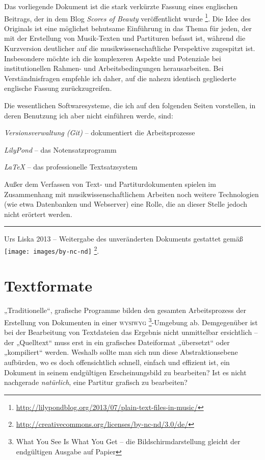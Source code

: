 \documentclass[DIV=12]{scrreprt}
\begin{document}
\medskip
Das vorliegende Dokument ist die stark verkürzte Fassung eines englischen Beitrags, der in dem Blog \emph{Scores of Beauty} veröffentlicht wurde%
\footnote{\url{http://lilypondblog.org/2013/07/plain-text-files-in-music/}}.
Die Idee des Originals ist eine möglichst behutsame Einführung in das Thema für jeden, der mit der Erstellung von Musik-Texten und Partituren befasst ist, während die Kurzversion deutlicher auf die musikwissenschaftliche Perspektive zugespitzt ist.
Insbesondere möchte ich die komplexeren Aspekte und Potenziale bei institutionellen Rahmen- und Arbeitsbedingungen herausarbeiten.
Bei Verständnisfragen empfehle ich daher, auf die nahezu identisch gegliederte englische Fassung zurückzugreifen.

Die wesentlichen Softwaresysteme, die ich auf den folgenden Seiten vorstellen, in deren Benutzung ich aber nicht einführen werde, sind:

\begin{itemize*}
\item \emph{Versionsverwaltung (Git)} -- dokumentiert die Arbeitsprozesse
\item \emph{LilyPond} -- das Notensatzprogramm
\item \emph{\LaTeX} -- das professionelle Textsatzsystem
\end{itemize*}

Außer dem Verfassen von Text- und Partiturdokumenten spielen im Zusammenhang mit musikwissenschaftlichem Arbeiten noch weitere Technologien (wie etwa Datenbanken und Webserver) eine Rolle, die an dieser Stelle jedoch nicht erörtert werden.

\vfill
\hrule
\medskip
\textcopyright{} Urs Liska 2013 -- Weitergabe des unveränderten Dokuments gestattet gemäß \texttt{[image: images/by-nc-nd]}
\footnote{\url{http://creativecommons.org/licenses/by-nc-nd/3.0/de/}}.

\tableofcontents

\chapter{Textformate}
\label{chap:pt_plain-text-format}
„Traditionelle“, grafische Programme bilden den gesamten Arbeitsprozess der Erstellung von Dokumenten in einer \textsc{wysiwyg%
\footnote{What You See Is What You Get -- die Bildschirmdarstellung gleicht der endgültigen Ausgabe auf Papier}}-Umgebung ab.
Demgegenüber ist bei der Bearbeitung von Textdateien das Ergebnis nicht unmittelbar ersichtlich -- der „Quelltext“ muss erst in ein grafisches Dateiformat „übersetzt“ oder „kompiliert“ werden.
Weshalb sollte man sich nun diese Abstraktionsebene aufbürden, wo es doch offensichtlich schnell, einfach und effizient ist, ein Dokument in seinem endgültigen Erscheinungsbild zu bearbeiten?
Ist es nicht nachgerade \emph{natürlich}, eine Partitur grafisch zu bearbeiten?
\end{document}
